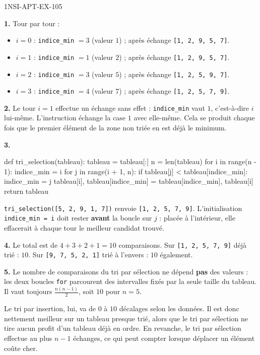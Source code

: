 \begin{corrige}{1NSI-APT-EX-105}

\textbf{1.} Tour par tour :
\begin{itemize}
  \item $i=0$ : \lstinline{indice_min} $=3$ (valeur $1$) ; après échange
    \lstinline{[1, 2, 9, 5, 7]}.
  \item $i=1$ : \lstinline{indice_min} $=1$ (valeur $2$) ; après échange
    \lstinline{[1, 2, 9, 5, 7]}.
  \item $i=2$ : \lstinline{indice_min} $=3$ (valeur $5$) ; après échange
    \lstinline{[1, 2, 5, 9, 7]}.
  \item $i=3$ : \lstinline{indice_min} $=4$ (valeur $7$) ; après échange
    \lstinline{[1, 2, 5, 7, 9]}.
\end{itemize}

\textbf{2.} Le tour $i=1$ effectue un échange sans effet : \lstinline{indice_min} vaut $1$,
c'est-à-dire $i$ lui-même. L'instruction échange la case $1$ avec elle-même. Cela se
produit chaque fois que le premier élément de la zone non triée en est déjà le minimum.

\textbf{3.}
\begin{python}
def tri_selection(tableau):
    tableau = tableau[:]
    n = len(tableau)
    for i in range(n - 1):
        indice_min = i
        for j in range(i + 1, n):
            if tableau[j] < tableau[indice_min]:
                indice_min = j
        tableau[i], tableau[indice_min] = tableau[indice_min], tableau[i]
    return tableau
\end{python}
\lstinline{tri_selection([5, 2, 9, 1, 7])} renvoie \lstinline{[1, 2, 5, 7, 9]}.
L'initialisation \lstinline{indice_min = i} doit rester \textbf{avant} la boucle sur $j$ :
placée à l'intérieur, elle effacerait à chaque tour le meilleur candidat trouvé.

\textbf{4.} Le total est de $4+3+2+1 = 10$ comparaisons. Sur \lstinline{[1, 2, 5, 7, 9]}
déjà trié : $10$. Sur \lstinline{[9, 7, 5, 2, 1]} trié à l'envers : $10$ également.

\textbf{5.} Le nombre de comparaisons du tri par sélection ne dépend \textbf{pas} des
valeurs : les deux boucles \lstinline{for} parcourent des intervalles fixés par la seule
taille du tableau. Il vaut toujours $\frac{n(n-1)}{2}$, soit $10$ pour $n=5$.

Le tri par insertion, lui, va de $0$ à $10$ décalages selon les données. Il est donc
nettement meilleur sur un tableau presque trié, alors que le tri par sélection ne tire
aucun profit d'un tableau déjà en ordre. En revanche, le tri par sélection effectue au plus
$n-1$ échanges, ce qui peut compter lorsque déplacer un élément coûte cher.

\end{corrige}
